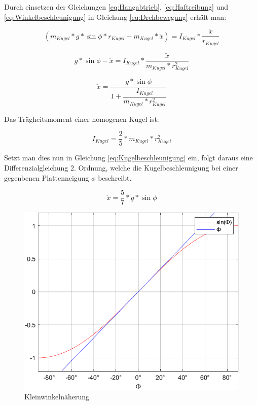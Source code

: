 \documentclass[12pt,a4paper,bibliography=totoc,listof=totoc]{scrartcl}
\begin{document}
Durch einsetzen der Gleichungen \ref{eq:Hangabtrieb}, \ref{eq:Haftreibung} und \ref{eq:Winkelbeschleunigung} in Gleichung \ref{eq:Drehbewegung} erhält man:

\begin{equation} 
(m_{Kugel} *  g *\sin\phi * r_{Kugel} - m_{Kugel} * \ddot{x}) = I_{Kugel} * \frac{\ddot{x}}{r_{Kugel}}
\end{equation}

\begin{equation} 
g * \sin\phi - \ddot{x} = I_{Kugel} * \frac{\ddot{x}}{m_{Kugel} * r_{Kugel}^2}
\end{equation}

\begin{equation} 
\ddot{x} =  \dfrac{g * \sin\phi }{1 + \dfrac{I_{Kugel}}{m_{Kugel} * r_{Kugel}^2}}
\label{eq:Kugelbeschleunigung}
\end{equation}

Das Trägheitsmoment einer homogenen Kugel ist:

\begin{equation} 
I_{Kugel} =  \frac{2}{5} * m_{Kugel} * r_{Kugel}^2
\end{equation}

Setzt man dies nun in Gleichung \ref{eq:Kugelbeschleunigung} ein, folgt daraus eine Differenzialgleichung 2. Ordnung, welche die Kugelbeschleunigung bei einer gegenbenen Plattenneigung \(\phi\) beschreibt.

\begin{equation} 
\ddot{x} =  \dfrac{5}{7}*g* \sin\phi
\end{equation}

\begin{figure}[htb]
	\centering
	\includegraphics[scale = 1]{pics/Kleinwinkel}
	\caption{Kleinwinkelnäherung}
	\label{Kleinwinkel}
\end{figure}
\end{document}

